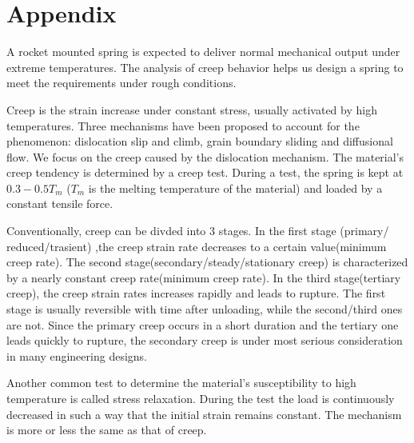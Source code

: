 \documentclass[10pt]{article}
\begin{document}



\section{Appendix}
\label{sec:Appendix}
A rocket mounted spring is expected to deliver normal mechanical output under extreme temperatures. The analysis of creep behavior helps us design a spring to meet the requirements under rough conditions.

Creep is the strain increase under constant stress, usually activated by high temperatures. Three mechanisms have been proposed to account for the phenomenon: dislocation slip and climb, grain boundary sliding and diffusional flow. We focus on the creep caused by the dislocation mechanism. The material's creep tendency is determined by a creep test. During a test, the spring is kept at $0.3-0.5T_m$ ($T_m$ is the melting temperature of the material) and loaded by a constant tensile force.

Conventionally, creep can be divded into $3$ stages. In the first stage (primary/ reduced/trasient) ,the creep strain rate decreases to a certain value(minimum creep rate). The second stage(secondary/steady/stationary creep) is characterized by a nearly constant creep rate(minimum creep rate). In the third stage(tertiary creep), the creep strain rates increases rapidly and leads to rupture. The first stage is usually reversible with time after unloading, while the second/third ones are not. Since the primary creep occurs in a short duration and the tertiary one leads quickly to rupture, the secondary creep is under most serious consideration in many engineering designs.

Another common test to determine the material's susceptibility to high temperature is called stress relaxation. During the test the load is continuously decreased in such a way that the initial strain remains constant. The mechanism is more or less the same as that of creep.
\end{document}
